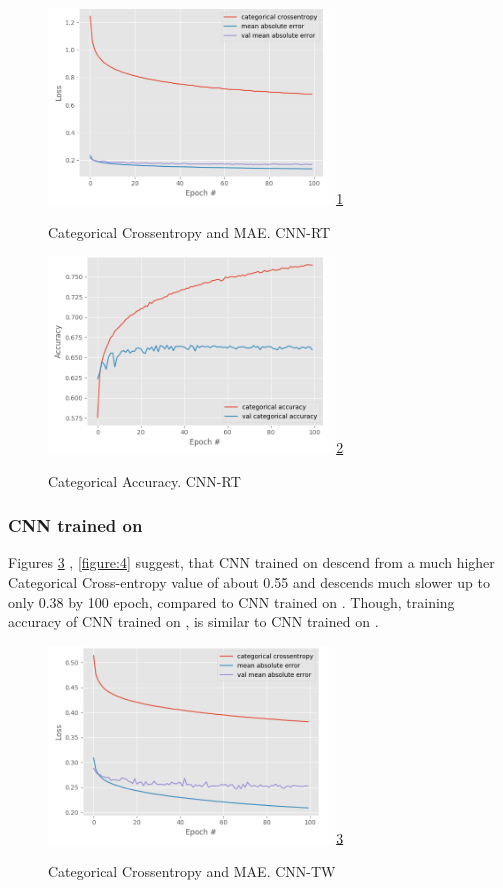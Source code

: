 \documentclass[conference]{IEEEtran}
\begin{document}
			\begin{figure}
				\caption{Categorical Crossentropy and MAE. CNN-RT}
				\centering
				\includegraphics[width=7.5cm]{categorical_crossentropy_mae_cnn-rt.png}
				\label{figure:1}
				\ref{figure:1}
			\end{figure}
			
			\begin{figure}
				\caption{Categorical Accuracy. CNN-RT}
				\centering
				\includegraphics[width=7.5cm]{categorical_accuracy_cnn-rt.png}
				\label{figure:2}
				\ref{figure:2}
			\end{figure}
			
		
		\subsubsection{CNN trained on \TW}
		
			Figures \ref{figure:3} , \ref{figure:4} suggest, that CNN trained on \TW descend from a much higher Categorical Cross-entropy value of about 0.55 and descends much slower up to only 0.38 by 100 epoch, compared to CNN trained on \RT. Though, training accuracy of CNN trained on \TW, is similar to CNN trained on \RT.
			
			\begin{figure}
				\caption{Categorical Crossentropy and MAE. CNN-TW}
				\centering
				\includegraphics[width=7.5cm]{categorical_crossentropy_mae_cnn-TW.png}
				\label{figure:3}
				\ref{figure:3}
			\end{figure}
			
\end{document}
